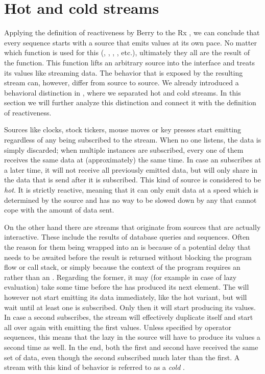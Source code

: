 \section{Hot and cold streams}
Applying the definition of reactiveness by Berry \cite{berry1989-Reactive} to the Rx \obs, we can conclude that every \obs sequence starts with a source that emits values at its own pace. No matter which function is used for this (, , , , etc.), ultimately they all are the result of the  function. This function lifts an arbitrary source into the \obs interface and treats its values like streaming data. The behavior that is exposed by the resulting stream can, however, differ from source to source. We already introduced a behavioral distinction in , where we separated hot and cold streams. In this section we will further analyze this distinction and connect it with the definition of reactiveness. 

Sources like clocks, stock tickers, mouse moves or key presses start emitting regardless of any \obv being subscribed to the stream. When no one listens, the data is simply discarded; when multiple \obv instances are subscribed, every one of them receives the same data at (approximately) the same time. In case an \obv subscribes at a later time, it will not receive all previously emitted data, but will only share in the data that is send after it is subscribed. This kind of source is considered to be \textit{hot}. It is strictly reactive, meaning that it can only emit data at a speed which is determined by the source and has no way to be slowed down by any \obv that cannot cope with the amount of data sent.

On the other hand there are streams that originate from sources that are actually interactive. These include the results of database queries and \ieb sequences. Often the reason for them being wrapped into an \obs is because of a potential delay that needs to be awaited before the result is returned without blocking the program flow or call stack, or simply because the context of the program requires an \obs rather than an \ieb. Regarding the former, it may (for example in case of lazy evaluation) take some time before the \ier has produced its next element. The \obs will however not start emitting its data immediately, like the hot variant, but will wait until at least one \obv is subscribed. Only then it will start producing its values. In case a second \obv subscribes, the stream will effectively duplicate itself and start all over again with emitting the first values. Unless specified by operator sequences, this means that the lazy \ier in the source will have to produce its values a second time as well. In the end, both the first and second \obv have received the same set of data, even though the second subscribed much later than the first. A stream with this kind of behavior is referred to as a \textit{cold} \obs.

